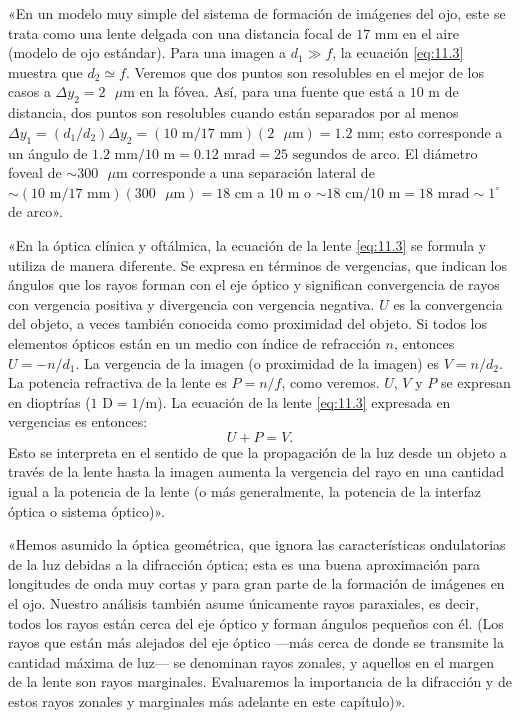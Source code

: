 \documentclass[12pt]{book}
\begin{document}
«En un modelo muy simple del sistema de formación de imágenes del ojo, este se trata como una lente delgada con una distancia focal de $17\text{ mm}$ en el aire (modelo de ojo estándar). Para una imagen a $d_1 \gg f$, la ecuación \eqref{eq:11.3} muestra que $d_2 \simeq f$. Veremos que dos puntos son resolubles en el mejor de los casos a $\Delta y_2 = 2\text{ }\mu\text{m}$ en la fóvea. Así, para una fuente que está a $10\text{ m}$ de distancia, dos puntos son resolubles cuando están separados por al menos $\Delta y_1 = (d_1 / d_2) \Delta y_2 = (10\text{ m} / 17\text{ mm}) (2\text{ }\mu\text{m}) = 1.2\text{ mm}$; esto corresponde a un ángulo de $1.2\text{ mm} / 10\text{ m} = 0.12\text{ mrad} = 25\text{ segundos de arco}$. El diámetro foveal de $\sim 300\text{ }\mu\text{m}$ corresponde a una separación lateral de $\sim (10\text{ m} / 17\text{ mm}) (300\text{ }\mu\text{m}) = 18\text{ cm}$ a $10\text{ m}$ o $\sim 18\text{ cm} / 10\text{ m} = 18\text{ mrad} \sim 1^\circ$ de arco».

«En la óptica clínica y oftálmica, la ecuación de la lente \eqref{eq:11.3} se formula y utiliza de manera diferente. Se expresa en términos de vergencias, que indican los ángulos que los rayos forman con el eje óptico y significan convergencia de rayos con vergencia positiva y divergencia con vergencia negativa. $U$ es la convergencia del objeto, a veces también conocida como proximidad del objeto. Si todos los elementos ópticos están en un medio con índice de refracción $n$, entonces $U = -n / d_1$. La vergencia de la imagen (o proximidad de la imagen) es $V = n / d_2$. La potencia refractiva de la lente es $P = n / f$, como veremos. $U$, $V$ y $P$ se expresan en dioptrías ($1\text{ D} = 1/\text{m}$). La ecuación de la lente \eqref{eq:11.3} expresada en vergencias es entonces:
\begin{equation}
U + P = V. \label{eq:11.5}
\end{equation}
Esto se interpreta en el sentido de que la propagación de la luz desde un objeto a través de la lente hasta la imagen aumenta la vergencia del rayo en una cantidad igual a la potencia de la lente (o más generalmente, la potencia de la interfaz óptica o sistema óptico)».

«Hemos asumido la óptica geométrica, que ignora las características ondulatorias de la luz debidas a la difracción óptica; esta es una buena aproximación para longitudes de onda muy cortas y para gran parte de la formación de imágenes en el ojo. Nuestro análisis también asume únicamente rayos paraxiales, es decir, todos los rayos están cerca del eje óptico y forman ángulos pequeños con él. (Los rayos que están más alejados del eje óptico ---más cerca de donde se transmite la cantidad máxima de luz--- se denominan rayos zonales, y aquellos en el margen de la lente son rayos marginales. Evaluaremos la importancia de la difracción y de estos rayos zonales y marginales más adelante en este capítulo)».
\end{document}
